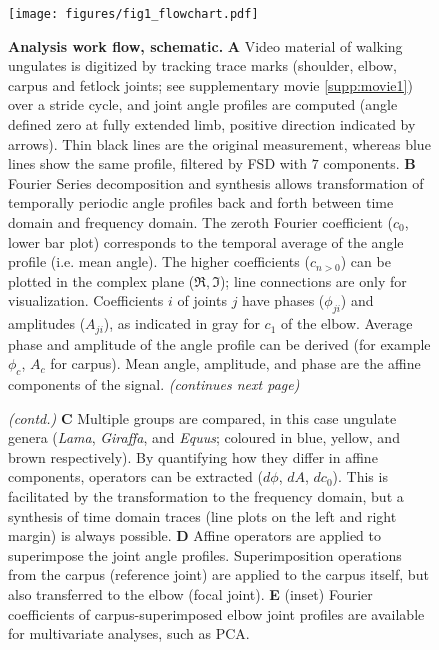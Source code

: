 \begin{figure}[p]
\begin{center}
\texttt{[image: figures/fig1\_flowchart.pdf]}
\end{center}
\caption{\textbf{Analysis work flow, schematic. }
\textbf{A} Video material of walking ungulates is digitized by tracking trace marks (shoulder, elbow, carpus and fetlock joints; see supplementary movie \ref*{supp:movie1}) over a stride cycle, and joint angle profiles are computed (angle defined zero at fully extended limb, positive direction indicated by arrows). Thin black lines are the original measurement, whereas blue lines show the same profile, filtered by FSD with $7$ components.
\textbf{B} Fourier Series decomposition and synthesis allows transformation of temporally periodic angle profiles back and forth between time domain and frequency domain. The zeroth Fourier coefficient ($c_{0}$, lower bar plot) corresponds to the temporal average of the angle profile (i.e. mean angle). The higher coefficients ($c_{n>0}$) can be plotted in the complex plane ($\Re, \Im$); line connections are only for visualization. Coefficients $i$ of joints $j$ have phases ($\phi_{ji}$) and amplitudes ($A_{ji}$), as indicated in gray for $c_{1}$ of the elbow. Average phase and amplitude of the angle profile can be derived (for example $\phi_{c}$, $A_{c}$ for carpus). Mean angle, amplitude, and phase are the affine components of the signal.
\textit{(continues next page)}
  }
\label{fig:workflow}
\end{figure}

\addtocounter{figure}{-1}
\begin{figure} [t!]
  \caption{
\textit{(contd.)}
\textbf{C} Multiple groups are compared, in this case ungulate genera (\textit{Lama}, \textit{Giraffa}, and \textit{Equus}; coloured in blue, yellow, and brown respectively). By quantifying how they differ in affine components, operators can be extracted ($d\phi$, $dA$, $dc_{0}$). This is facilitated by the transformation to the frequency domain, but a synthesis of time domain traces (line plots on the left and right margin) is always possible.
 \textbf{D} Affine operators are applied to superimpose the joint angle profiles. Superimposition operations from the carpus (reference joint) are applied to the carpus itself, but also transferred to the elbow (focal joint).
\textbf{E} (inset) Fourier coefficients of carpus-superimposed elbow joint profiles are available for multivariate analyses, such as PCA.
  }
\end{figure}



